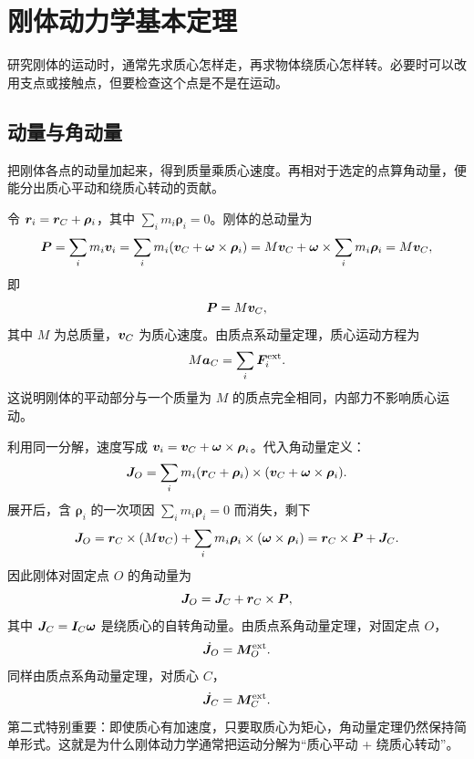 \section{刚体动力学基本定理}

研究刚体的运动时，通常先求质心怎样走，再求物体绕质心怎样转。必要时可以改用支点或接触点，但要检查这个点是不是在运动。

\subsection{动量与角动量}

把刚体各点的动量加起来，得到质量乘质心速度。再相对于选定的点算角动量，便能分出质心平动和绕质心转动的贡献。

令 \(\boldsymbol{r}_i=\boldsymbol{r}_C+\boldsymbol\rho_i\)，其中 \(\sum_i m_i\boldsymbol\rho_i=0\)。刚体的总动量为
\[
\boldsymbol{P}=\sum_i m_i\boldsymbol{v}_i
=\sum_i m_i(\boldsymbol{v}_C+\boldsymbol{\omega}\times\boldsymbol\rho_i)
=M\boldsymbol{v}_C+\boldsymbol{\omega}\times\sum_i m_i\boldsymbol\rho_i
=M\boldsymbol{v}_C,
\]
即
\begin{equation}
\boldsymbol{P}=M\boldsymbol{v}_C,
\label{eq:rigid-momentum}
\end{equation}
其中 \(M\) 为总质量，\(\boldsymbol{v}_C\) 为质心速度。由质点系动量定理，质心运动方程为
\begin{equation}
M\boldsymbol{a}_C=\sum_i\boldsymbol{F}_i^{\rm ext}.
\label{eq:rigid-cm-equation}
\end{equation}
这说明刚体的平动部分与一个质量为 \(M\) 的质点完全相同，内部力不影响质心运动。

利用同一分解，速度写成 \(\boldsymbol{v}_i=\boldsymbol{v}_C+\boldsymbol{\omega}\times\boldsymbol\rho_i\)。代入角动量定义：
\[
\boldsymbol{J}_O=\sum_i m_i(\boldsymbol{r}_C+\boldsymbol\rho_i)\times(\boldsymbol{v}_C+\boldsymbol{\omega}\times\boldsymbol\rho_i).
\]
展开后，含 \(\boldsymbol\rho_i\) 的一次项因 \(\sum_i m_i\boldsymbol\rho_i=0\) 而消失，剩下
\[
\boldsymbol{J}_O=\boldsymbol{r}_C\times(M\boldsymbol{v}_C)
+\sum_i m_i\boldsymbol\rho_i\times(\boldsymbol{\omega}\times\boldsymbol\rho_i)
=\boldsymbol{r}_C\times\boldsymbol{P}+\boldsymbol{J}_C.
\]
因此刚体对固定点 \(O\) 的角动量为
\begin{equation}
\boldsymbol{J}_O=\boldsymbol{J}_C+\boldsymbol{r}_C\times\boldsymbol{P},
\label{eq:rigid-J-decomp}
\end{equation}
其中 \(\boldsymbol{J}_C=\boldsymbol{I}_C\boldsymbol{\omega}\) 是绕质心的自转角动量。由质点系角动量定理，对固定点 \(O\)，
\begin{equation}
\dot{\boldsymbol{J}}_O=\boldsymbol{M}_O^{\rm ext}.
\label{eq:rigid-angular-momentum}
\end{equation}
同样由质点系角动量定理，对质心 \(C\)，
\begin{equation}
\dot{\boldsymbol{J}}_C=\boldsymbol{M}_C^{\rm ext}.
\label{eq:rigid-angular-momentum-cm}
\end{equation}
第二式特别重要：即使质心有加速度，只要取质心为矩心，角动量定理仍然保持简单形式。这就是为什么刚体动力学通常把运动分解为“质心平动 + 绕质心转动”。

